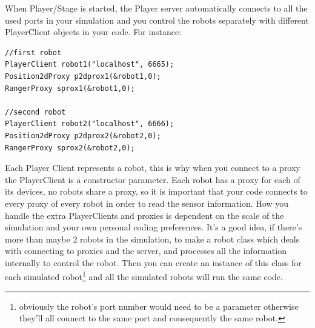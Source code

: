 \documentclass[a4paper]{report}
\newcommand{\plst}{Player/Stage\xspace}
\newcommand{\pl}{Player\xspace}
\begin{document}
When \plst is started, the \pl server automatically connects to all the used ports in your simulation and you control the robots separately with different PlayerClient objects in your code. For instance:
\begin{verbatim}
//first robot
PlayerClient robot1("localhost", 6665);
Position2dProxy p2dprox1(&robot1,0);
RangerProxy sprox1(&robot1,0);

//second robot
PlayerClient robot2("localhost", 6666);
Position2dProxy p2dprox2(&robot2,0);
RangerProxy sprox2(&robot2,0);
\end{verbatim}
Each \pl Client represents a robot, this is why when you connect to a proxy
the PlayerClient is a constructor parameter. Each robot has a proxy for
each of its devices, no robots share a proxy, so it is important that your
code connects to every proxy of every robot in order to read the sensor
information.
%
How you handle the extra PlayerClients and proxies is dependent on the
scale of the simulation and your own personal coding preferences. It's a
good idea, if there's more than maybe 2 robots in the simulation, to make a
robot class which deals with connecting to proxies and the server, and
processes all the information internally to control the robot. Then you can
create an instance of this class for each simulated
robot\footnote{obviously the robot's port number would need to be a
parameter otherwise they'll all connect to the same port and consequently
the same robot.} and all the simulated robots will run the same code.
\end{document}
